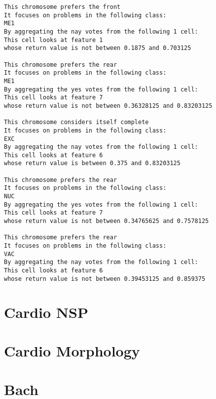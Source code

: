 \begin{lstlisting}[caption={Best Hunter, Yeast}]
This chromosome prefers the front
It focuses on problems in the following class:
ME1
By aggregating the nay votes from the following 1 cell:
This cell looks at feature 1
whose return value is not between 0.1875 and 0.703125 

This chromosome prefers the rear
It focuses on problems in the following class:
ME1
By aggregating the yes votes from the following 1 cell:
This cell looks at feature 7
whose return value is not between 0.36328125 and 0.83203125 

This chromosome considers itself complete
It focuses on problems in the following class:
EXC
By aggregating the nay votes from the following 1 cell:
This cell looks at feature 6
whose return value is between 0.375 and 0.83203125 

This chromosome prefers the rear
It focuses on problems in the following class:
NUC
By aggregating the yes votes from the following 1 cell:
This cell looks at feature 7
whose return value is not between 0.34765625 and 0.7578125 

This chromosome prefers the rear
It focuses on problems in the following class:
VAC
By aggregating the nay votes from the following 1 cell:
This cell looks at feature 6
whose return value is not between 0.39453125 and 0.859375 

\end{lstlisting}


\section{Cardio NSP}



\section{Cardio Morphology}



\section{Bach}